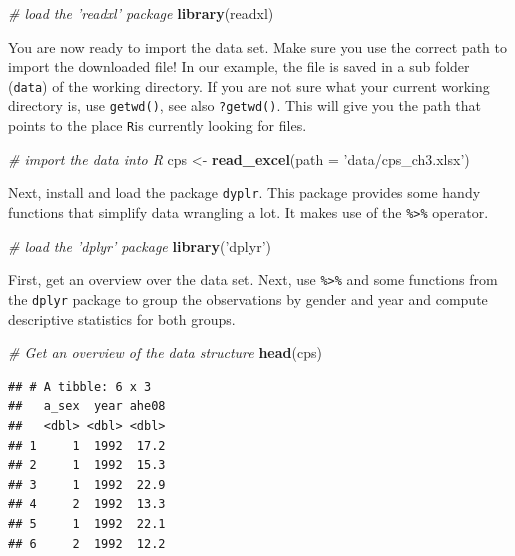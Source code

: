 \documentclass[]{book}
\newenvironment{Shaded}{\begin{snugshade}}{\end{snugshade}}
\newcommand{\KeywordTok}[1]{\textcolor[rgb]{0.13,0.29,0.53}{\textbf{#1}}}
\newcommand{\DataTypeTok}[1]{\textcolor[rgb]{0.13,0.29,0.53}{#1}}
\newcommand{\StringTok}[1]{\textcolor[rgb]{0.31,0.60,0.02}{#1}}
\newcommand{\CommentTok}[1]{\textcolor[rgb]{0.56,0.35,0.01}{\textit{#1}}}
\newcommand{\NormalTok}[1]{#1}
\theoremstyle{definition}
\theoremstyle{definition}
\theoremstyle{definition}
\theoremstyle{remark}
\begin{document}
\begin{Shaded}
\begin{Highlighting}[]
\CommentTok{# load the 'readxl' package}
\KeywordTok{library}\NormalTok{(readxl)}
\end{Highlighting}
\end{Shaded}

You are now ready to import the data set. Make sure you use the correct
path to import the downloaded file! In our example, the file is saved in
a sub folder (\texttt{data}) of the working directory. If you are not
sure what your current working directory is, use \texttt{getwd()}, see
also \texttt{?getwd()}. This will give you the path that points to the
place \texttt{R}is currently looking for files.

\begin{Shaded}
\begin{Highlighting}[]
\CommentTok{# import the data into R}
\NormalTok{cps <-}\StringTok{ }\KeywordTok{read_excel}\NormalTok{(}\DataTypeTok{path =} \StringTok{'data/cps_ch3.xlsx'}\NormalTok{)}
\end{Highlighting}
\end{Shaded}

Next, install and load the package \texttt{dyplr}. This package provides
some handy functions that simplify data wrangling a lot. It makes use of
the \texttt{\%>\%} operator.

\begin{Shaded}
\begin{Highlighting}[]
\CommentTok{# load the 'dplyr' package}
\KeywordTok{library}\NormalTok{(}\StringTok{'dplyr'}\NormalTok{)}
\end{Highlighting}
\end{Shaded}

First, get an overview over the data set. Next, use \texttt{\%>\%} and
some functions from the \texttt{dplyr} package to group the observations
by gender and year and compute descriptive statistics for both groups.

\begin{Shaded}
\begin{Highlighting}[]
\CommentTok{# Get an overview of the data structure}
\KeywordTok{head}\NormalTok{(cps)}
\end{Highlighting}
\end{Shaded}

\begin{verbatim}
## # A tibble: 6 x 3
##   a_sex  year ahe08
##   <dbl> <dbl> <dbl>
## 1     1  1992  17.2
## 2     1  1992  15.3
## 3     1  1992  22.9
## 4     2  1992  13.3
## 5     1  1992  22.1
## 6     2  1992  12.2
\end{verbatim}
\end{document}
